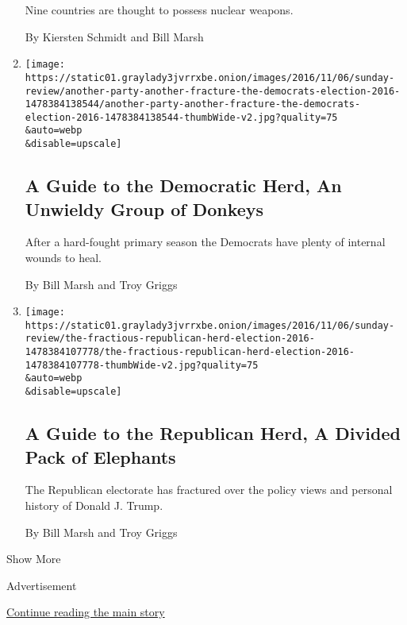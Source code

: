 \begin{enumerate}
  Nine countries are thought to possess nuclear weapons.

  By Kiersten Schmidt and Bill Marsh
\item
  \href{/interactive/2016/11/06/sunday-review/another-party-another-fracture-the-democrats-election-2016.html}{}

  \texttt{[image: https://static01.graylady3jvrrxbe.onion/images/2016/11/06/sunday-review/another-party-another-fracture-the-democrats-election-2016-1478384138544/another-party-another-fracture-the-democrats-election-2016-1478384138544-thumbWide-v2.jpg?quality=75\\\&auto=webp\\\&disable=upscale]}

  \hypertarget{a-guide-to-the-democratic-herd-an-unwieldy-group-of-donkeys}{%
  \subsection{A Guide to the Democratic Herd, An Unwieldy Group of
  Donkeys}\label{a-guide-to-the-democratic-herd-an-unwieldy-group-of-donkeys}}

  After a hard-fought primary season the Democrats have plenty of
  internal wounds to heal.

  By Bill Marsh and Troy Griggs
\item
  \href{/interactive/2016/11/06/sunday-review/the-fractious-republican-herd-election-2016.html}{}

  \texttt{[image: https://static01.graylady3jvrrxbe.onion/images/2016/11/06/sunday-review/the-fractious-republican-herd-election-2016-1478384107778/the-fractious-republican-herd-election-2016-1478384107778-thumbWide-v2.jpg?quality=75\\\&auto=webp\\\&disable=upscale]}

  \hypertarget{a-guide-to-the-republican-herd-a-divided-pack-of-elephants}{%
  \subsection{A Guide to the Republican Herd, A Divided Pack of
  Elephants}\label{a-guide-to-the-republican-herd-a-divided-pack-of-elephants}}

  The Republican electorate has fractured over the policy views and
  personal history of Donald J. Trump.

  By Bill Marsh and Troy Griggs
\end{enumerate}

Show More

Advertisement

\protect\hyperlink{after-mid2}{Continue reading the main story}

